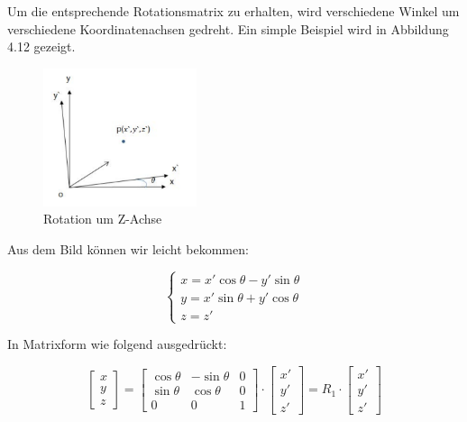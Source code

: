 Um die entsprechende Rotationsmatrix zu erhalten, wird verschiedene Winkel um verschiedene Koordinatenachsen gedreht. Ein simple Beispiel wird in Abbildung 4.12 gezeigt.

\begin{figure}[H]
 \centering 
 \includegraphics[keepaspectratio,width=0.4\textwidth]{images/4_ZweiteErfahrung/Kamera/rotationsmatrix.pdf}
 \caption{Rotation um Z-Achse}
 \label{fig:rotation}
\end{figure} 

Aus dem Bild können wir leicht bekommen:

\begin{equation}
   \begin{cases} 
	x = x'\cos\theta - y'\sin\theta \\	
	y = x'\sin\theta + y'\cos\theta \\
	z = z'
	\end{cases}
\end{equation}

In Matrixform wie folgend ausgedrückt:

\begin{equation}
   \begin{bmatrix}
	x \\  
	y \\
	z
	\end{bmatrix} = \begin{bmatrix}
	\cos\theta & -\sin\theta & 0	\\
	\sin\theta & \cos\theta  & 0	\\
	0    	   & 0           & 1	
	\end{bmatrix} \cdot \begin{bmatrix}
	x' \\  
	y' \\
	z'
	\end{bmatrix}= R_1 \cdot \begin{bmatrix}
	x' \\  
	y' \\
	z'
	\end{bmatrix}
\end{equation}

